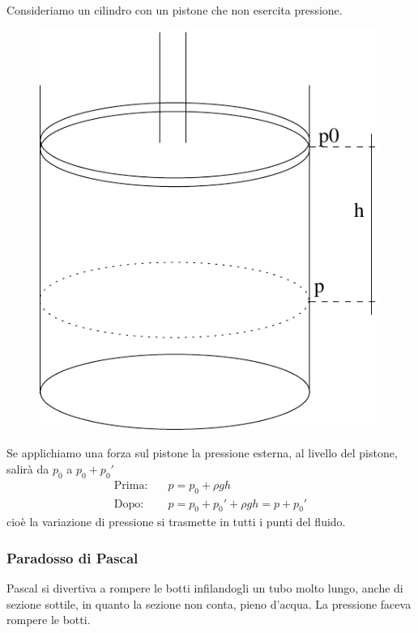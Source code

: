 Consideriamo un cilindro con un pistone che non esercita pressione.

\begin{figure}[htbp]
   \centering
   \includegraphics[scale=0.5]{immagini/fisica1/Pascal1}
\end{figure}

Se applichiamo una forza sul pistone la pressione esterna, al livello del pistone, salirà da $p_0$ a $p_0+p_0'$
\begin{align*}
   \text{Prima:} & \quad p=p_0+\rho gh             \\
   \text{Dopo:}  & \quad p=p_0+p_0'+\rho gh=p+p_0'
\end{align*}
cioè la variazione di pressione si trasmette in tutti i punti del fluido.
\subsubsection{Paradosso di Pascal}
Pascal si divertiva a rompere le botti infilandogli un tubo molto lungo, anche di sezione sottile, in quanto la sezione non conta, pieno d'acqua. La pressione faceva rompere le botti.

